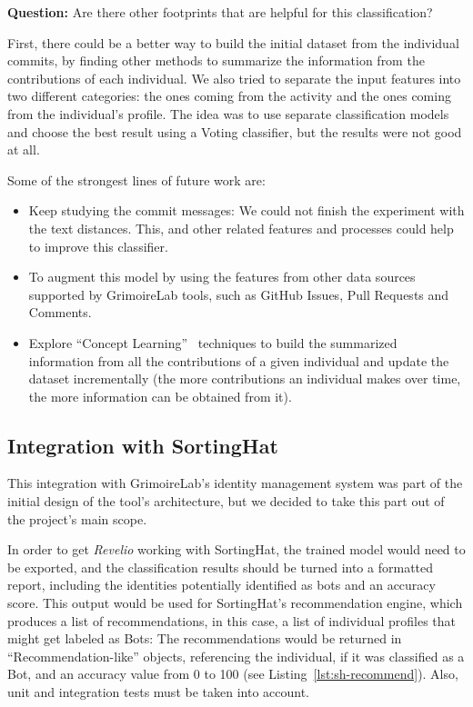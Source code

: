 \documentclass[a4paper, 12pt]{book}
\begin{document}
\textbf{Question:} Are there other footprints that are helpful for this classification?

First, there could be a better way to build the initial dataset from the individual commits, by finding other methods to summarize the information from the contributions of each individual. We also tried to separate the input features into two different categories: the ones coming from the activity and the ones coming from the individual's profile. The idea was to use separate classification models and choose the best result using a Voting classifier, but the results were not good at all.


Some of the strongest lines of future work are:
\begin{itemize}
    \item Keep studying the commit messages: We could not finish the experiment with the text distances. This, and other related features and processes could help to improve this classifier.
    \item To augment this model by using the features from other data sources supported by GrimoireLab tools, such as GitHub Issues, Pull Requests and Comments. 
    \item Explore ``Concept Learning''~\cite{machinelearning-artdatascience} techniques to build the summarized information from all the contributions of a given individual and update the dataset incrementally (the more contributions an individual makes over time, the more information can be obtained from it).
\end{itemize}

\subsection{Integration with SortingHat}
\label{ssec:integration-sortinghat}

This integration with GrimoireLab's identity management system was part of the initial design of the tool's architecture, but we decided to take this part out of the project's main scope.

In order to get \emph{Revelio} working with SortingHat, the trained model would need to be exported, and the classification results should be turned into a formatted report, including the identities potentially identified as bots and an accuracy score. This output would be used for SortingHat's recommendation engine, which produces a list of recommendations, in this case, a list of individual profiles that might get labeled as Bots: The recommendations would be returned in ``Recommendation-like'' objects, referencing the individual, if it was classified as a Bot, and an accuracy value from 0 to 100 (see Listing~\ref{lst:sh-recommend}). Also, unit and integration tests must be taken into account.
\end{document}
